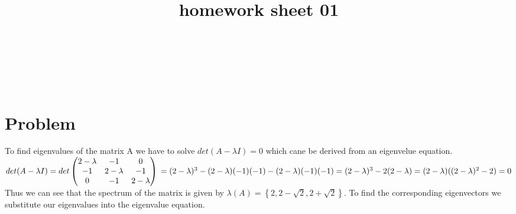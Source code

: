 \documentclass{article}
\title{homework sheet 01}
\author{
	\name{Denys Sobchyshak}\\
	\imat{03636581}\\
	\email{denys.sobchyshak@gmail.com}
	\And
	\name{Serge Zakharov} \\
	\imat{03636642}\\
	\email{zsn2008@gmail.com}
}
\begin{document}
	\maketitle
	
	\section{Problem}
	To find eigenvalues of the matrix A we have to solve $ det(A-\lambda I)=0 $ which cane be derived from an eigenvelue equation. \\
	$
	det(A-\lambda I)= det
	\begin{pmatrix} 
		2-\lambda & -1 & 0  \\ 
		-1 & 2-\lambda & -1 \\ 
		0 & -1 & 2-\lambda
	\end{pmatrix}\\
	=(2-\lambda)^3-(2-\lambda)(-1)(-1)-(2-\lambda)(-1)(-1)\\
	=(2-\lambda)^3-2(2-\lambda)=(2-\lambda)((2-\lambda)^2-2)=0
	$\\
	Thus we can see that the spectrum of the matrix is given by $\lambda(A)=\left\{2, 2-\sqrt{2},2+\sqrt{2}\right\}$. To find the corresponding eigenvectors we substitute our eigenvalues into the eigenvalue equation.\\
\end{document}
